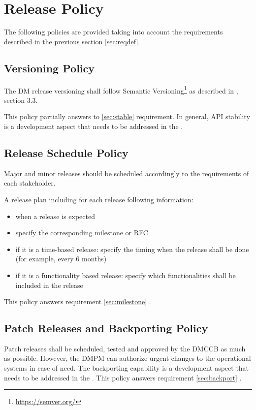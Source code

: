 \section{Release Policy} \label{sec:policy}

The following policies are provided taking into account the requirements described in the previous section \ref{sec:reqdef}.


\subsection{Versioning Policy} \label{sec:versinopolicy}

The DM release versioning shall follow Semantic Versioning\footnote{\url{https://semver.org/}} as described in , section 3.3.

This policy partially answers to \ref{sec:stable} requirement.
In general, API stability is a development aspect that needs to be addressed in the \citep{DevGuide}.


\subsection{Release Schedule Policy} \label{sec:schedulepolicy}

Major and minor releases should be scheduled accordingly to the requirements of each stakeholder.

A release plan including for each release following information:

\begin{itemize}
\item when a release is expected
\item specify the corresponding milestone or RFC
\item if it is a time-based release: specify the timing when the release shall be done (for example, every 6 months)
\item if it is a functionality based release: specify which functionalities shall be included in the release
\end{itemize}

This policy answers requirement \ref{sec:milestone} .


\subsection{Patch Releases and Backporting Policy} \label{sec:patchpolicy}

Patch releases shall be scheduled, tested and approved by the DMCCB as much as possible.
However, the DMPM can authorize urgent changes to the operational systems in case of need.
The backporting capability is a development aspect that needs to be addressed in the \citep{DevGuide}.
This policy answers requirement  \ref{sec:backport} .


